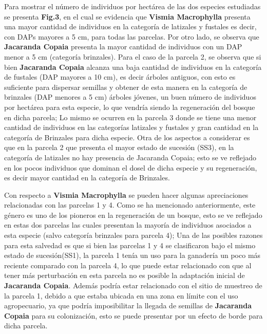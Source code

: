 \documentclass[letterpaper,9pt,twocolumn,twoside,]{pinp}
\begin{document}
Para mostrar el número de individuos por hectárea de las dos especies
estudiadas se presenta \textbf{Fig.3}, en el cual se evidencia que
\textbf{Vismia Macrophylla} presenta una mayor cantidad de individuos en
la categoría de latizales y fustales es decir, con DAPs mayores a 5 cm,
para todas las parcelas. Por otro lado, se observa que \textbf{Jacaranda
Copaia} presenta la mayor cantidad de individuos con un DAP menor a 5 cm
(categoría brinzales). Para el caso de la parcela 2, se observa que si
bien \textbf{Jacaranda Copaia} alcanza una baja cantidad de individuos
en la categoría de fustales (DAP mayores a 10 cm), es decir árboles
antiguos, con esto es suficiente para dispersar semillas y obtener de
esta manera en la categoría de brinzales (DAP menores a 5 cm) árboles
jóvenes, un buen número de individuos por hectárea para esta especie, lo
que vendría siendo la regeneración del bosque en dicha parcela; Lo mismo
se ocurren en la parcela 3 donde se tiene una menor cantidad de
individuos en las categorías latizales y fustales y gran cantidad en la
categoría de Brinzales para dicha especie. Otra de los aspectos a
considerar es que en la parcela 2 que presenta el mayor estado de
sucesión (SS3), en la categoría de latizales no hay presencia de
Jacaranda Copaia; esto se ve reflejado en los pocos individuos que
dominan el dosel de dicha especie y su regeneración, es decir mayor
cantidad en la categoría de Brinzales.

Con respecto a \textbf{Vismia Macrophylla} se pueden hacer algunas
apreciaciones relacionadas con las parcelas 1 y 4. Como se ha mencionado
anteriormente, este género es uno de los pioneros en la regeneración de
un bosque, esto se ve reflejado en estas dos parcelas las cuales
presentan la mayoría de individuos asociados a esta especie (salvo
categoría brinzales para parcela 4); Una de las posibles razones para
esta salvedad es que si bien las parcelas 1 y 4 se clasificaron bajo el
mismo estado de sucesión(SS1), la parcela 1 tenía un uso para la
ganadería un poco más reciente comparado con la parcela 4, lo que puede
estar relacionado con que al tener más perturbación en esta parcela no
es posible la adaptación inicial de \textbf{Jacaranda Copaia}. Además
podría estar relacionado con el sitio de muestreo de la parcela 1,
debido a que estaba ubicada en una zona en límite con el uso
agropecuario, ya que podría imposibilitar la llegada de semillas de
\textbf{Jacaranda Copaia} para su colonización, esto se puede presentar
por un efecto de borde para dicha parcela.
\end{document}
